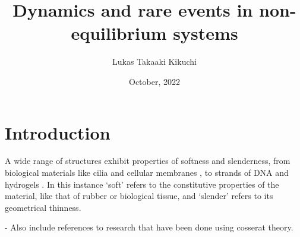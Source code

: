 \documentclass[withindex,glossary,techreport]{cam-thesis}
\title{Dynamics and rare events in non-equilibrium systems}
\author{Lukas Takaaki Kikuchi}
\date{October, 2022}
\begin{document}
\frontmatter{}






\chapter{Introduction}



A wide range of structures exhibit properties of softness and slenderness, from biological materials like cilia \citep{guMagneticCiliaCarpets2020} and cellular membranes \citep{krishnaswamyCosserattypeModelRed1996}, to strands of DNA \citep{corazzaUnravelingLoopingEfficiency2022a} and hydrogels \citep{rajanMechanicsViscoelasticBuckling2019}. In this instance `soft' refers to the constitutive properties of the material, like that of rubber or biological tissue, and `slender' refers to its geometrical thinness.

- Also include references to research that have been done using cosserat theory.

\end{document}
